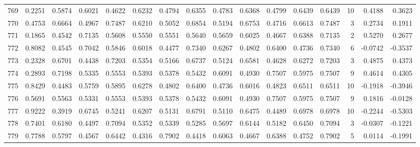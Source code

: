 \begin{tabular}{lrrrrrrrrrrrrrrr}
769 &      0.2251 &  0.5874 &  0.6021 &  0.4622 &  0.6232 &  0.4794 &  0.6355 &  0.4783 &  0.6368 &  0.4799 &   0.6439 &     0.6439 &     10 &                    0.4188 &                     0.3623 \\
770 &      0.4753 &  0.6664 &  0.4967 &  0.7487 &  0.6210 &  0.5052 &  0.6854 &  0.5194 &  0.6753 &  0.4716 &   0.6613 &     0.7487 &      3 &                    0.2734 &                     0.1911 \\
771 &      0.1865 &  0.4542 &  0.7135 &  0.5608 &  0.5550 &  0.5551 &  0.5640 &  0.5659 &  0.6025 &  0.4667 &   0.6388 &     0.7135 &      2 &                    0.5270 &                     0.2677 \\
772 &      0.8082 &  0.4545 &  0.7042 &  0.5846 &  0.6018 &  0.4477 &  0.7340 &  0.6267 &  0.4802 &  0.6400 &   0.4736 &     0.7340 &      6 &                   -0.0742 &                    -0.3537 \\
773 &      0.2328 &  0.6701 &  0.4438 &  0.7203 &  0.5354 &  0.5166 &  0.6737 &  0.5124 &  0.6581 &  0.4628 &   0.6272 &     0.7203 &      3 &                    0.4875 &                     0.4373 \\
774 &      0.2893 &  0.7198 &  0.5335 &  0.5553 &  0.5393 &  0.5378 &  0.5432 &  0.6091 &  0.4930 &  0.7507 &   0.5975 &     0.7507 &      9 &                    0.4614 &                     0.4305 \\
775 &      0.8429 &  0.4483 &  0.5759 &  0.5895 &  0.6278 &  0.4802 &  0.6400 &  0.4736 &  0.6016 &  0.4823 &   0.6511 &     0.6511 &     10 &                   -0.1918 &                    -0.3946 \\
776 &      0.5691 &  0.5563 &  0.5331 &  0.5553 &  0.5393 &  0.5378 &  0.5432 &  0.6091 &  0.4930 &  0.7507 &   0.5975 &     0.7507 &      9 &                    0.1816 &                    -0.0128 \\
777 &      0.9222 &  0.3919 &  0.6745 &  0.5241 &  0.6207 &  0.5131 &  0.6791 &  0.5110 &  0.6475 &  0.4489 &   0.6978 &     0.6978 &     10 &                   -0.2244 &                    -0.5303 \\
778 &      0.7401 &  0.6180 &  0.4497 &  0.7094 &  0.5352 &  0.5339 &  0.5285 &  0.5697 &  0.6144 &  0.5182 &   0.6450 &     0.7094 &      3 &                   -0.0307 &                    -0.1221 \\
779 &      0.7788 &  0.5797 &  0.4567 &  0.6442 &  0.4316 &  0.7902 &  0.4418 &  0.6063 &  0.4667 &  0.6388 &   0.4752 &     0.7902 &      5 &                    0.0114 &                    -0.1991 \\

\end{tabular}
